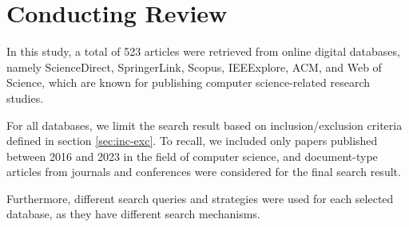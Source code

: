 \section{Conducting Review}

In this study, a total of 523 articles were retrieved from online digital databases, namely ScienceDirect, SpringerLink, Scopus, IEEExplore, ACM, and Web of Science, which are known for publishing computer science-related research studies.

For all databases, we limit the search result based on inclusion/exclusion criteria defined in section \ref{sec:inc-exc}. To recall, we included only papers published between 2016 and 2023 in the field of computer science, and document-type articles from journals and conferences were considered for the final search result.

Furthermore, different search queries and strategies were used for each selected database, as they have different search mechanisms. 










